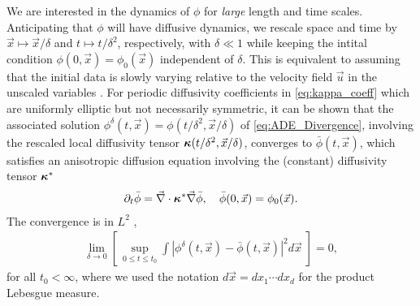 \documentclass[11pt]{amsart}
\newcommand\bkappa{\mbox{\boldmath${\kappa}$}}
\begin{document}
We are interested in the dynamics of $\phi$ for \emph{large} length and
time scales. Anticipating that $\phi$ will have diffusive dynamics, we
rescale space and time by $\vec{x}\mapsto\vec{x}/\delta$ and $t\mapsto t/\delta^2$,
respectively, with $\delta\ll1$ while keeping the intital condition
$\phi(0,\vec{x})=\phi_0(\vec{x})$ independent 
of $\delta$. This is equivalent to assuming that the initial data is slowly
varying relative to the velocity field $\vec{u}$ in the unscaled
variables
\cite{McLaughlin:SIAM_JAM:780,Fannjiang:SIAM_JAM:333,Fannjiang:1997:1033}. 
For periodic diffusivity coefficients in \eqref{eq:kappa_coeff} which
are uniformly elliptic but not necessarily symmetric, it can be shown 
\cite{Fannjiang:SIAM_JAM:333} that the associated solution
$\phi^\delta(t,\vec{x})=\phi(t/\delta^2,\vec{x}/\delta)$  of \eqref{eq:ADE_Divergence},
involving the rescaled local diffusivity tensor
$\bkappa(t/\delta^2,\vec{x}/\delta)$, converges to $\bar{\phi}(t,\vec{x})$, which
satisfies an anisotropic diffusion equation involving the (constant)
diffusivity tensor $\bkappa^*$
%
\begin{align}
  \partial_t\bar{\phi}=\vec{\nabla}\cdot\bkappa^*\vec{\nabla}\bar{\phi}, \quad
  \bar{\phi}(0,\vec{x})=\phi_0(\vec{x}).
\end{align}
%
The convergence is in $L^2$ \cite{Fannjiang:SIAM_JAM:333},
%
\begin{align}
  \lim_{\delta\to0}\left[\,\sup_{0\leq t\leq t_0}
    \int\left|\phi^\delta(t,\vec{x})-\bar{\phi}(t,\vec{x})\right|^2d\vec{x}
    \;\right]=0,
\end{align}
%
for all $t_0<\infty$, where we used the notation $d\vec{x}=dx_1\cdots dx_d$ for
the product Lebesgue measure.
\end{document}
